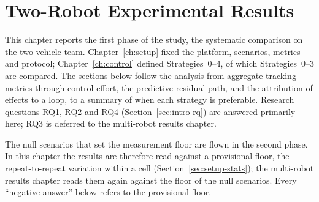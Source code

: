 %
%
%

\chapter{Two-Robot Experimental Results}
\label{ch:results2}

This chapter reports the first phase of the study, the systematic comparison on the two-vehicle
team. Chapter~\ref{ch:setup}
fixed the platform, scenarios, metrics and protocol; Chapter~\ref{ch:control}
defined Strategies~0--4, of which Strategies~0--3 are compared. The sections below follow the analysis
from aggregate tracking metrics through control effort, the predictive residual path, and the
attribution of effects to a loop, to a summary of when each strategy is preferable. Research
questions RQ1, RQ2 and RQ4 (Section~\ref{sec:intro-rq}) are answered primarily here; RQ3 is
deferred to the multi-robot results chapter.

The null scenarios that set the measurement floor are flown in the second phase. In this chapter the
results are therefore read against a provisional floor, the repeat-to-repeat variation within a
cell (Section~\ref{sec:setup-stats}); the multi-robot results chapter reads them again against the
floor of the null scenarios. Every ``negative answer'' below refers to the provisional floor.

